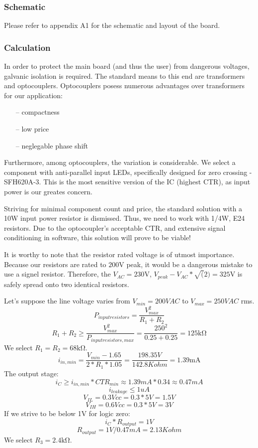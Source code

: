 \subsubsection{Schematic}
Please refer to appendix A1 for the schematic and layout of the board.

\subsubsection{Calculation}
In order to protect the main board (and thus the user) from dangerous voltages, galvanic isolation is required.
The standard means to this end are transformers and optocouplers.
Optocouplers posess numerous advantages over transformers for our application:
\begin{itemize}
\item[--]{compactness}
\item[--]{low price}
\item[--]{neglegable phase shift}
\end{itemize}
Furthermore, among optocouplers, the variation is considerable.
We select a component with anti-parallel input LEDs, specifically designed for zero crossing - SFH620A-3.
This is the most sensitive version of the IC (highest CTR), as input power is our greates concern.
\par
Striving for minimal component count and price, the standard solution with a 10W input power resistor is dismissed.
Thus, we need to work with 1/4W, E24 resistors.
Due to the optocoupler's acceptable CTR, and extensive signal conditioning in software, this solution will prove to be viable!
\par
It is worthy to note that the resistor rated voltage is of utmost importance.
Because our resistors are rated to $200\si{\volt}$ peak, it would be a dangerous mistake to use a signel resistor.
Therefore, the $V_{AC} = 230\si{\volt}$, $V_{peak} - V_{AC} * \sqrt(2) = 325\si{\volt}$ is safely spread onto two identical resistors.
\par
Let's suppose the line voltage varies from $V_{min} = 200VAC$ to $V_{max} = 250VAC$ rms.
$$ P_{input resistors} = \frac{V_{max}^2}{R_1 + R_2}$$
$$ R_1 + R_2 \geq \frac{V_{max}^2}{P_{input resistors, max}} = \frac{250^2}{0.25+0.25} = 125\si{\kilo\ohm}$$
We select $R_1 = R_2 = 68\si{\kilo\ohm}$.
$$ i_{in, min} = \frac{V_{min} - 1.65}{2 * R_1 *1.05} = \frac{198.35V}{142.8Kohm} =  1.39\si{\milli\ampere}$$
The output stage:
$$  i_C \geq i_{in, min} * CTR_{min} \approx 1.39 mA * 0.34 \approx 0.47mA $$
$$ i_{leakage} \leq 1uA $$
$$ V_{IL} = 0.3 Vcc = 0.3 * 5V = 1.5V $$
$$ V_{IH} = 0.6 Vcc = 0.3 * 5V = 3V $$
If we strive to be below 1V for logic zero:
$$ i_C * R_{output} = 1V $$
$$ R_{output} = 1V / 0.47mA = 2.13Kohm$$
We select $R_3 = 2.4\si{\kilo\ohm}$.

